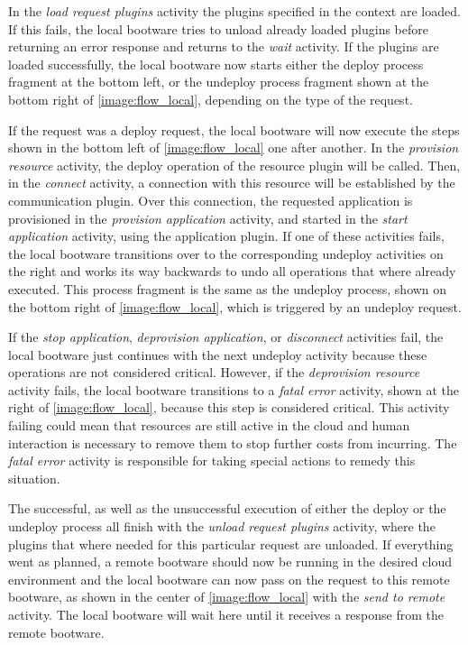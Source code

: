 In the \textit{load request plugins} activity the plugins specified in the context are loaded.
If this fails, the local bootware tries to unload already loaded plugins before returning an error response and returns to the \textit{wait} activity.
If the plugins are loaded successfully, the local bootware now starts either the deploy process fragment at the bottom left, or the undeploy process fragment shown at the bottom right of \autoref{image:flow_local}, depending on the type of the request.

If the request was a deploy request, the local bootware will now execute the steps shown in the bottom left of \autoref{image:flow_local} one after another.
In the \textit{provision resource} activity, the deploy operation of the resource plugin will be called.
Then, in the \textit{connect} activity, a connection with this resource will be established by the communication plugin.
Over this connection, the requested application is provisioned in the \textit{provision application} activity, and started in the \textit{start application} activity, using the application plugin.
If one of these activities fails, the local bootware transitions over to the corresponding undeploy activities on the right and works its way backwards to undo all operations that where already executed.
This process fragment is the same as the undeploy process, shown on the bottom right of \autoref{image:flow_local}, which is triggered by an undeploy request.

If the \textit{stop application}, \textit{deprovision application}, or \textit{disconnect} activities fail, the local bootware just continues with the next undeploy activity because these operations are not considered critical.
However, if the \textit{deprovision resource} activity fails, the local bootware transitions to a \textit{fatal error} activity, shown at the right of \autoref{image:flow_local}, because this step is considered critical.
This activity failing could mean that resources are still active in the cloud and human interaction is necessary to remove them to stop further costs from incurring.
The \textit{fatal error} activity is responsible for taking special actions to remedy this situation.

The successful, as well as the unsuccessful execution of either the deploy or the undeploy process all finish with the \textit{unload request plugins} activity, where the plugins that where needed for this particular request are unloaded.
If everything went as planned, a remote bootware should now be running in the desired cloud environment and the local bootware can now pass on the request to this remote bootware, as shown in the center of \autoref{image:flow_local} with the \textit{send to remote} activity.
The local bootware will wait here until it receives a response from the remote bootware.

